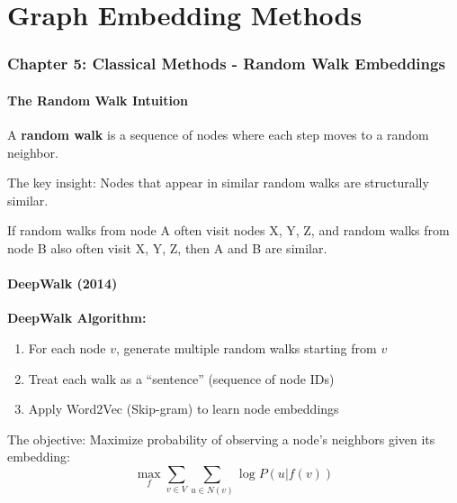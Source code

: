 \documentclass[12pt,a4paper]{article}
\begin{document}
\part{Graph Embedding Methods}

\section{Chapter 5: Classical Methods - Random Walk Embeddings}

\subsection{The Random Walk Intuition}

\begin{concept}
A \textbf{random walk} is a sequence of nodes where each step moves to a random neighbor.

The key insight: Nodes that appear in similar random walks are structurally similar.

If random walks from node A often visit nodes X, Y, Z, and random walks from node B also often visit X, Y, Z, then A and B are similar.
\end{concept}

\subsection{DeepWalk (2014)}

\begin{mathbox}
\textbf{DeepWalk Algorithm:}
\begin{enumerate}
    \item For each node $v$, generate multiple random walks starting from $v$
    \item Treat each walk as a ``sentence'' (sequence of node IDs)
    \item Apply Word2Vec (Skip-gram) to learn node embeddings
\end{enumerate}

The objective: Maximize probability of observing a node's neighbors given its embedding:
\[
\max_f \sum_{v \in V} \sum_{u \in N(v)} \log P(u | f(v))
\]
\end{mathbox}
\end{document}
